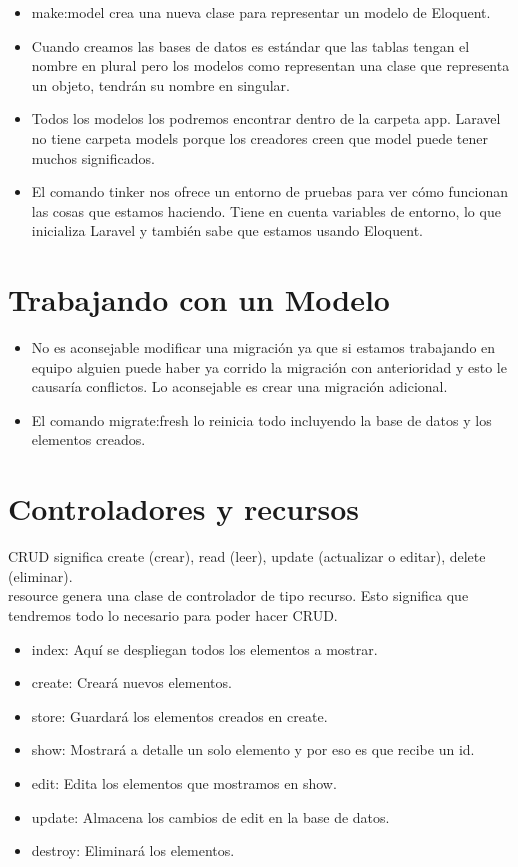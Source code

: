 \documentclass{article}
\begin{document}
\begin{itemize}
  \item make:model crea una nueva clase para representar un modelo de Eloquent.
  \item Cuando creamos las bases de datos es estándar que las tablas tengan el
    nombre en plural pero los modelos como representan una clase que representa
    un objeto, tendrán su nombre en singular.
  \item Todos los modelos los podremos encontrar dentro de la carpeta app.
    Laravel no tiene carpeta models porque los creadores creen que model puede
    tener muchos significados.
  \item El comando tinker nos ofrece un entorno de pruebas para ver cómo
    funcionan las cosas que estamos haciendo. Tiene en cuenta variables de
    entorno, lo que inicializa Laravel y también sabe que estamos usando
    Eloquent.
\end{itemize}

\section{Trabajando con un Modelo}%
\begin{itemize}
  \item No es aconsejable modificar una migración ya que si estamos trabajando
    en equipo alguien puede haber ya corrido la migración con anterioridad y
    esto le causaría conflictos. Lo aconsejable es crear una migración
    adicional.
  \item El comando migrate:fresh lo reinicia todo incluyendo la base de datos y
    los elementos creados.
\end{itemize}

\section{Controladores y recursos}%
CRUD significa create (crear), read (leer), update (actualizar o editar),
delete (eliminar).\\

resource genera una clase de controlador de tipo recurso. Esto significa que
tendremos todo lo necesario para poder hacer CRUD.\\

\begin{itemize}
  \item index: Aquí se despliegan todos los elementos a mostrar.
  \item create: Creará nuevos elementos.
  \item store: Guardará los elementos creados en create.
  \item show: Mostrará a detalle un solo elemento y por eso es que recibe un id.
  \item edit: Edita los elementos que mostramos en show.
  \item update: Almacena los cambios de edit en la base de datos.
  \item destroy: Eliminará los elementos.
\end{itemize}
\end{document}
